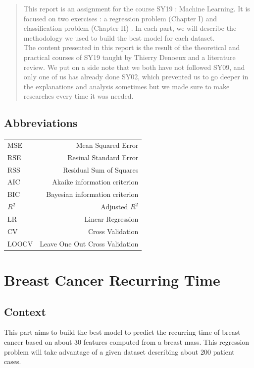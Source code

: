 \documentclass[]{report}
\begin{document}
\begin{abstract}
	
	
	
This report is an assignment for the course SY19 : Machine Learning. It is focused on two exercises : a regression problem (Chapter I) and classification problem (Chapter II) . In each part, we will describe the methodology we used to build the best model for each dataset.\\
The content presented in this report is the result of the theoretical and practical courses of SY19 taught by Thierry Denoeux and a literature review. We put on a side note that we both have not followed SY09, and only one of us has already done SY02, which prevented us to go deeper in the explanations and analysis sometimes but we made sure to make researches every time it was needed.

\end{abstract}


\tableofcontents

\newpage
\section{Abbreviations}
\begin{center}
\begin{tabular}{l r}
	MSE & Mean Squared Error \\
	RSE & Resiual Standard Error\\ 
	RSS & Residual Sum of Squares \\
	AIC & Akaike information criterion \\
	BIC & Bayesian information criterion \\
	$R^{2}$ & Adjusted $R^{2}$ \\
	LR & Linear Regression \\
	CV & Cross Validation \\
	LOOCV & Leave One Out Cross Validation \\
\end{tabular}
\end{center}



\chapter{Breast Cancer Recurring Time}

\section{Context}
This part aims to build the best model to predict the recurring time of breast cancer based on about 30 features computed from a breast mass.  This regression problem will take advantage of a given dataset describing about 200 patient cases.
\end{document}
